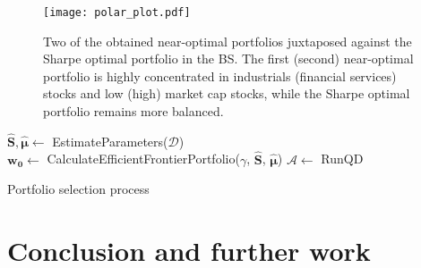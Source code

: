\begin{figure}[ht!]
\texttt{[image: polar\_plot.pdf]}
\centering
\caption{Two of the obtained near-optimal portfolios juxtaposed against the Sharpe optimal portfolio in the BS. The first (second) near-optimal portfolio is highly concentrated in industrials (financial services) stocks and low (high) market cap stocks, while the Sharpe optimal portfolio remains more balanced.}
\label{figure3}
\end{figure}


\begin{algorithm}[t!]
\SetAlgoLined
{}
$\boldsymbol{\hat{S}}, \boldsymbol{\hat{\mu}} \gets $ EstimateParameters($\mathcal{D}$) \\
$\boldsymbol{w_0} \gets$ CalculateEfficientFrontierPortfolio($\gamma$, $\boldsymbol{\hat{S}}$, $\boldsymbol{\hat{\mu}}$) 
$\mathcal{A} \gets$ RunQD 
 
\caption{Portfolio selection process}
\label{algo:invest}
\end{algorithm}

\vspace{-1.0cm}
\section{Conclusion and further work}


